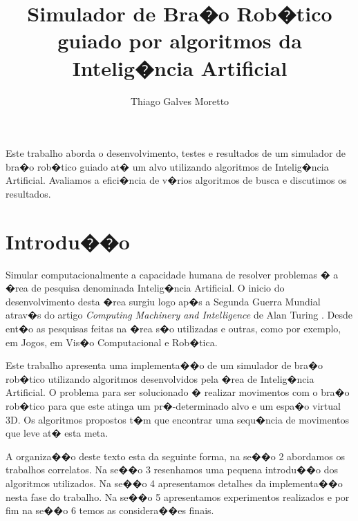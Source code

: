 \documentclass[12pt]{article}
\title{Simulador de Bra�o Rob�tico guiado por algoritmos da Intelig�ncia Artificial}
\author{Thiago Galves Moretto\inst{1}}
\begin{document}
\maketitle

\begin{resumo}
Este trabalho aborda o desenvolvimento, testes e resultados de um simulador de bra�o rob�tico guiado at� um alvo utilizando algoritmos de Intelig�ncia Artificial. Avaliamos a efici�ncia de v�rios algoritmos de busca e discutimos os resultados.
\end{resumo}

\section{Introdu��o}
Simular computacionalmente a capacidade humana de resolver problemas � a �rea de pesquisa denominada Intelig�ncia Artificial. O inicio do desenvolvimento desta �rea surgiu logo ap�s a Segunda Guerra Mundial atrav�s do artigo \textit{Computing Machinery and Intelligence} de Alan Turing \cite{turing1950}. Desde ent�o as pesquisas feitas na �rea s�o utilizadas e outras, como por exemplo, em Jogos\cite{funge2004}, em Vis�o Computacional\cite{forsyth2002} e Rob�tica\cite{ferguson2005}.


Este trabalho apresenta uma implementa��o de um simulador de bra�o rob�tico utilizando algoritmos desenvolvidos pela �rea de Intelig�ncia Artificial. O problema para ser solucionado � realizar movimentos com o bra�o rob�tico para que este atinga um pr�-determinado alvo e um espa�o virtual 3D. Os algoritmos propostos t�m que encontrar uma sequ�ncia de movimentos que leve at� esta meta. %

A organiza��o deste texto esta da seguinte forma, na se��o 2 abordamos os trabalhos correlatos. Na se��o 3 resenhamos uma pequena introdu��o dos algoritmos utilizados. Na se��o 4 apresentamos detalhes da implementa��o nesta fase do trabalho. Na se��o 5 apresentamos experimentos realizados e por fim na se��o 6 temos as considera��es finais.

\end{document}
